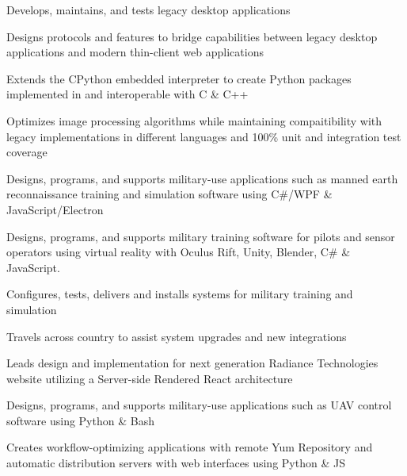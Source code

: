\documentclass[]{resume}
\begin{document}
\begin{minipage}[t]{0.69\textwidth}
\sectionsep

\begin{tightemize}
\item Develops, maintains, and tests legacy desktop applications
\item Designs protocols and features to bridge capabilities between legacy desktop applications and modern thin-client web applications
\item Extends the CPython embedded interpreter to create Python packages implemented in and interoperable with C \& C++
\item Optimizes image processing algorithms while maintaining compaitibility with legacy implementations in different languages and 100\% unit and integration test coverage
\end{tightemize}

\sectionsep

\begin{tightemize}
\item Designs, programs, and supports military-use applications such as manned earth reconnaissance training and simulation software using C\#/WPF \& JavaScript/Electron
\item Designs, programs, and supports military training software for pilots and sensor operators using virtual reality with Oculus Rift, Unity, Blender, C\# \& JavaScript.
\item Configures, tests, delivers and installs systems for military training and simulation
\item Travels across country to assist system upgrades and new integrations
\item Leads design and implementation for next generation Radiance Technologies website utilizing a Server-side Rendered React architecture
\end{tightemize}

\sectionsep

\begin{tightemize}
\item Designs, programs, and supports military-use applications such as UAV control software using Python \& Bash
\item Creates workflow-optimizing applications with remote Yum Repository and automatic distribution servers with web interfaces using Python \& JS
\end{tightemize}


\end{minipage}
\end{document}
